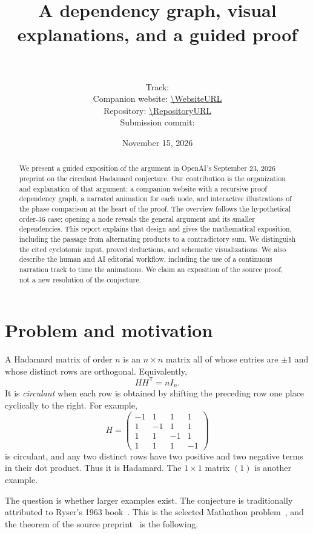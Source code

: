 \documentclass[11pt]{article}
\title{\ProjectTitle\\[0.3em]
  \large A dependency graph, visual explanations, and a guided proof}
\author{\TeamMembers{} \\ \TeamAffiliations{} \\
  \small Track: \CompetitionTrack{} \\
  \small Companion website: \url{\WebsiteURL} \\
  \small Repository: \url{\RepositoryURL} \\
  \small Submission commit: \texttt{\SubmissionCommit}}
\date{November 15, 2026}
\begin{document}
\maketitle

\begin{abstract}
We present a guided exposition of the argument in OpenAI's September 23,
2026 preprint on the circulant Hadamard conjecture. Our contribution is
the organization and explanation of that argument: a companion website
with a recursive proof dependency graph, a narrated animation for each
node, and interactive illustrations of the phase comparison at the heart
of the proof. The overview follows the hypothetical order-36 case;
opening a node reveals the general argument and its smaller dependencies.
This report explains that design and gives the mathematical exposition,
including the passage from alternating products to a contradictory sum.
We distinguish the cited cyclotomic input, proved deductions, and schematic
visualizations. We also describe the human and AI editorial workflow,
including the use of a continuous narration track to time the animations.
We claim an exposition of the source proof, not a new resolution of the
conjecture.
\end{abstract}

\section{Problem and motivation}%
\label{sec:problem}

A Hadamard matrix of order $n$ is an $n\times n$ matrix all of whose
entries are $\pm1$ and whose distinct rows are orthogonal. Equivalently,
\begin{equation}
 HH^{\mathsf T}=nI_{n}.%
 \label{eq:hadamard}
\end{equation}
It is \emph{circulant} when each row is obtained by shifting the preceding
row one place cyclically to the right. For example,
\[
 H=\begin{pmatrix}
 -1&1&1&1\\
 1&-1&1&1\\
 1&1&-1&1\\
 1&1&1&-1
 \end{pmatrix}
\]
is circulant, and any two distinct rows have two positive and two negative
terms in their dot product. Thus it is Hadamard. The $1\times1$ matrix
$(1)$ is another example.

The question is whether larger examples exist. The conjecture is traditionally
attributed to Ryser's 1963 book~\cite{ryser1963}. This is the selected
Mathathon problem~\cite{mathathon}, and the theorem of the source
preprint~\cite{circulant-source} is the following.
\end{document}
